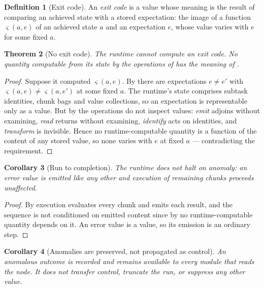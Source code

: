 \documentclass[11pt,a4paper]{article}
\theoremstyle{clstyle}
\newtheorem{theorem}{Theorem}[section]
\newtheorem{corollary}[theorem]{Corollary}
\theoremstyle{definition}
\newtheorem{definition}[theorem]{Definition}
\theoremstyle{remark}
\begin{document}
\begin{definition}[Exit code]
\label{def:exitcode}
An \emph{exit code} is a value whose meaning is the result of comparing an
achieved state with a stored expectation: the image of a function
$\varsigma(a,e)$ of an achieved state $a$ and an expectation $e$, whose value
varies with $e$ for some fixed $a$.
\end{definition}

\begin{theorem}[No exit code]
\label{thm:no-verdict}
The runtime cannot compute an exit code. No quantity computable from its
state by the operations of  has the meaning of
.
\end{theorem}

\begin{proof}
Suppose it computed $\varsigma(a,e)$. By  there are
expectations $e\neq e'$ with $\varsigma(a,e)\neq\varsigma(a,e')$ at some
fixed $a$. The runtime's state comprises subtask identities, chunk bags and
value collections, so an expectation is representable only as a value. But by
 the operations do not inspect values: \emph{emit} adjoins
without examining, \emph{read} returns without examining, \emph{identify}
acts on identities, and \emph{transform} is invisible. Hence no
runtime-computable quantity is a function of the content of any stored value,
so none varies with $e$ at fixed $a$ --- contradicting the requirement.
\end{proof}

\begin{corollary}[Run to completion]
\label{cor:completion}
The runtime does not halt on anomaly: an error value is emitted like any
other and execution of remaining chunks proceeds unaffected.
\end{corollary}

\begin{proof}
By  execution evaluates every chunk and emits each result, and
the sequence is not conditioned on emitted content since by
 no runtime-computable quantity depends on it. An error
value is a value, so its emission is an ordinary step.
\end{proof}

\begin{corollary}[Anomalies are preserved, not propagated as control]
\label{cor:anomaly}
An anomalous outcome is recorded and remains available to every module that
reads the node. It does not transfer control, truncate the run, or suppress
any other value.
\end{corollary}
\end{document}
